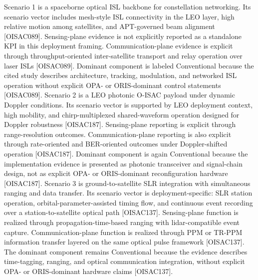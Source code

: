 {}
\markdownRendererSectionEnd \markdownRendererSectionBegin
{}\markdownRendererInterblockSeparator
{}Scenario 1 is a spaceborne optical ISL backbone for constellation networking. Its scenario vector includes mesh-style ISL connectivity in the LEO layer, high relative motion among satellites, and APT-governed beam alignment [O\markdownRendererUnderscore{}ISAC\markdownRendererUnderscore{}089]. Sensing-plane evidence is not explicitly reported as a standalone KPI in this deployment framing. Communication-plane evidence is explicit through throughput-oriented inter-satellite transport and relay operation over laser ISLs [O\markdownRendererUnderscore{}ISAC\markdownRendererUnderscore{}089]. Dominant component is labeled Conventional because the cited study describes architecture, tracking, modulation, and networked ISL operation without explicit OPA- or ORIS-dominant control statements [O\markdownRendererUnderscore{}ISAC\markdownRendererUnderscore{}089].\markdownRendererParagraphSeparator
{}Scenario 2 is a LEO photonic O-ISAC payload under dynamic Doppler conditions. Its scenario vector is supported by LEO deployment context, high mobility, and chirp-multiplexed shared-waveform operation designed for Doppler robustness [O\markdownRendererUnderscore{}ISAC\markdownRendererUnderscore{}187]. Sensing-plane reporting is explicit through range-resolution outcomes. Communication-plane reporting is also explicit through rate-oriented and BER-oriented outcomes under Doppler-shifted operation [O\markdownRendererUnderscore{}ISAC\markdownRendererUnderscore{}187]. Dominant component is again Conventional because the implementation evidence is presented as photonic transceiver and signal-chain design, not as explicit OPA- or ORIS-dominant reconfiguration hardware [O\markdownRendererUnderscore{}ISAC\markdownRendererUnderscore{}187].\markdownRendererInterblockSeparator
{}
\markdownRendererSectionEnd \markdownRendererSectionBegin
{}\markdownRendererInterblockSeparator
{}Scenario 3 is ground-to-satellite SLR integration with simultaneous ranging and data transfer. Its scenario vector is deployment-specific: SLR station operation, orbital-parameter-assisted timing flow, and continuous event recording over a station-to-satellite optical path [O\markdownRendererUnderscore{}ISAC\markdownRendererUnderscore{}137]. Sensing-plane function is realized through propagation-time-based ranging with lidar-compatible event capture. Communication-plane function is realized through PPM or TR-PPM information transfer layered on the same optical pulse framework [O\markdownRendererUnderscore{}ISAC\markdownRendererUnderscore{}137]. The dominant component remains Conventional because the evidence describes time-tagging, ranging, and optical communication integration, without explicit OPA- or ORIS-dominant hardware claims [O\markdownRendererUnderscore{}ISAC\markdownRendererUnderscore{}137].\markdownRendererParagraphSeparator
